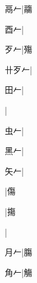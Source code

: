 \begin{multicols}{2}
{{\cjk{}{\cnsym{}　}鬲{\cnxHanaA{}𠂉}}|{\cjk{}鬺}\par
{\cjk{}{\cnsym{}　}酉{\cnxHanaA{}𠂉}}|{}\par
{\cjk{}{\cnsym{}　}歹{\cnxHanaA{}𠂉}}|{\cjk{}殤}\par
{\cjk{}卄歹{\cnxHanaA{}𠂉}}|{}\par
{\cjk{}{\cnsym{}　}田{\cnxHanaA{}𠂉}}|{}\par
{}|{}\par
{\cjk{}{\cnsym{}　}虫{\cnxHanaA{}𠂉}}|{}\par
{\cjk{}{\cnsym{}　}黑{\cnxHanaA{}𠂉}}|{}\par
{\cjk{}{\cnsym{}　}矢{\cnxHanaA{}𠂉}}|{}\par
{}|{\cjk{}傷}\par
{}|{\cjk{}摥}\par
{}|{}\par
{\cjk{}{\cnsym{}　}月{\cnxHanaA{}𠂉}}|{\cjk{}膓}\par
{\cjk{}{\cnsym{}　}角{\cnxHanaA{}𠂉}}|{\cjk{}觴}\par
}
\end{multicols}
